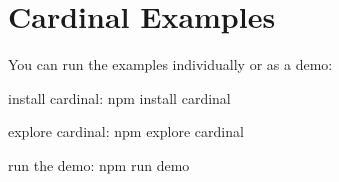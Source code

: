 \chapter{Cardinal Examples}
\hypertarget{md__c_1_2_users_2_s_t_r_i_d_e_r_2source_2repos_2_ainslie_a_p_i_2wwwroot_2lib_2jquery-ui_2node__mb4a42ea6a8087e9f38895dbe88a91629}{}\label{md__c_1_2_users_2_s_t_r_i_d_e_r_2source_2repos_2_ainslie_a_p_i_2wwwroot_2lib_2jquery-ui_2node__mb4a42ea6a8087e9f38895dbe88a91629}
\label{md__c_1_2_users_2_s_t_r_i_d_e_r_2source_2repos_2_ainslie_a_p_i_2wwwroot_2lib_2jquery-ui_2node__mb4a42ea6a8087e9f38895dbe88a91629_autotoc_md1871}%
%
 You can run the examples individually or as a demo\+:


\begin{DoxyItemize}
\item install cardinal\+: {\ttfamily npm install cardinal}
\item explore cardinal\+: {\ttfamily npm explore cardinal}
\item run the demo\+: {\ttfamily npm run demo} 
\end{DoxyItemize}